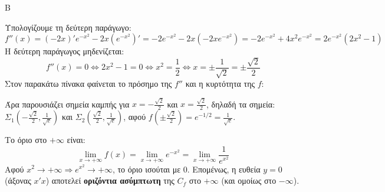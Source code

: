 \begin{thema}{Β}
\begin{erwthma}
\item Υπολογίζουμε τη δεύτερη παράγωγο:
\[ f''(x) = (-2x)' e^{-x^2} - 2x(e^{-x^2})' = -2 e^{-x^2} - 2x(-2x e^{-x^2}) = -2 e^{-x^2} + 4x^2 e^{-x^2} = 2e^{-x^2}(2x^2 - 1) \]
Η δεύτερη παράγωγος μηδενίζεται:
\[ f''(x) = 0 \Leftrightarrow 2x^2 - 1 = 0 \Leftrightarrow x^2 = \frac{1}{2} \Leftrightarrow x = \pm \frac{1}{\sqrt{2}} = \pm \frac{\sqrt{2}}{2} \]
Στον παρακάτω πίνακα φαίνεται το πρόσημο της $f''$ και η κυρτότητα της $f$:
\begin{center}
\end{center}
Άρα παρουσιάζει σημεία καμπής για $x = -\frac{\sqrt{2}}{2}$ και $x = \frac{\sqrt{2}}{2}$, δηλαδή τα σημεία:
$\Sigma_1\left(-\frac{\sqrt{2}}{2}, \frac{1}{\sqrt{e}}\right)$ και $\Sigma_2\left(\frac{\sqrt{2}}{2}, \frac{1}{\sqrt{e}}\right)$, αφού $f\left(\pm \frac{\sqrt{2}}{2} \right) = e^{-1/2} = \frac{1}{\sqrt{e}}$.

\item Το όριο στο $+\infty$ είναι:
\[ \lim_{x\to+\infty} f(x) = \lim_{x\to+\infty} e^{-x^2} = \lim_{x\to+\infty} \frac{1}{e^{x^2}} \]
Αφού $x^2 \to +\infty \Rightarrow e^{x^2} \to +\infty$, το όριο ισούται με 0.
Επομένως, η ευθεία $y = 0$ (άξονας $x'x$) αποτελεί \textbf{οριζόντια ασύμπτωτη} της $C_f$ στο $+\infty$ (και ομοίως στο $-\infty$).
\end{erwthma}
\end{thema}

